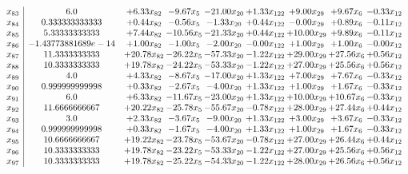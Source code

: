 \documentclass[8pt]{article}
\begin{document}
\[\begin{array}{c| c c@{\hskip 2pt} c@{\hskip 2pt} c@{\hskip 2pt} c@{\hskip 2pt} c@{\hskip 2pt} c@{\hskip 2pt} c@{\hskip 2pt} }
 x_{83}   &  6.0 & +  6.33 x_{82} & -9.67 x_{5} & -21.00 x_{20} & +  1.33 x_{122} & +  9.00 x_{29} & +  9.67 x_{6} & -0.33 x_{12}\\
 x_{84}   &  0.333333333333 & +  0.44 x_{82} & -0.56 x_{5} & -1.33 x_{20} & +  0.44 x_{122} & -0.00 x_{29} & +  0.89 x_{6} & -0.11 x_{12}\\
 x_{85}   &  5.33333333333 & +  7.44 x_{82} & -10.56 x_{5} & -21.33 x_{20} & +  0.44 x_{122} & + 10.00 x_{29} & +  9.89 x_{6} & -0.11 x_{12}\\
 x_{86}   &  -1.43773881689e-14 & +  1.00 x_{82} & -1.00 x_{5} & -2.00 x_{20} & -0.00 x_{122} & +  1.00 x_{29} & +  1.00 x_{6} & -0.00 x_{12}\\
 x_{87}   &  11.3333333333 & + 20.78 x_{82} & -26.22 x_{5} & -57.33 x_{20} & -1.22 x_{122} & + 29.00 x_{29} & + 27.56 x_{6} & +  0.56 x_{12}\\
 x_{88}   &  10.3333333333 & + 19.78 x_{82} & -24.22 x_{5} & -53.33 x_{20} & -1.22 x_{122} & + 27.00 x_{29} & + 25.56 x_{6} & +  0.56 x_{12}\\
 x_{89}   &  4.0 & +  4.33 x_{82} & -8.67 x_{5} & -17.00 x_{20} & +  1.33 x_{122} & +  7.00 x_{29} & +  7.67 x_{6} & -0.33 x_{12}\\
 x_{90}   &  0.999999999998 & +  0.33 x_{82} & -2.67 x_{5} & -4.00 x_{20} & +  1.33 x_{122} & +  1.00 x_{29} & +  1.67 x_{6} & -0.33 x_{12}\\
 x_{91}   &  6.0 & +  6.33 x_{82} & -11.67 x_{5} & -23.00 x_{20} & +  1.33 x_{122} & + 10.00 x_{29} & + 10.67 x_{6} & -0.33 x_{12}\\
 x_{92}   &  11.6666666667 & + 20.22 x_{82} & -25.78 x_{5} & -55.67 x_{20} & -0.78 x_{122} & + 28.00 x_{29} & + 27.44 x_{6} & +  0.44 x_{12}\\
 x_{93}   &  3.0 & +  2.33 x_{82} & -3.67 x_{5} & -9.00 x_{20} & +  1.33 x_{122} & +  3.00 x_{29} & +  3.67 x_{6} & -0.33 x_{12}\\
 x_{94}   &  0.999999999998 & +  0.33 x_{82} & -1.67 x_{5} & -4.00 x_{20} & +  1.33 x_{122} & +  1.00 x_{29} & +  1.67 x_{6} & -0.33 x_{12}\\
 x_{95}   &  10.6666666667 & + 19.22 x_{82} & -23.78 x_{5} & -53.67 x_{20} & -0.78 x_{122} & + 27.00 x_{29} & + 26.44 x_{6} & +  0.44 x_{12}\\
 x_{96}   &  10.3333333333 & + 19.78 x_{82} & -23.22 x_{5} & -53.33 x_{20} & -1.22 x_{122} & + 27.00 x_{29} & + 25.56 x_{6} & +  0.56 x_{12}\\
 x_{97}   &  10.3333333333 & + 19.78 x_{82} & -25.22 x_{5} & -54.33 x_{20} & -1.22 x_{122} & + 28.00 x_{29} & + 26.56 x_{6} & +  0.56 x_{12}\\

\end{array}\]
\end{document}
